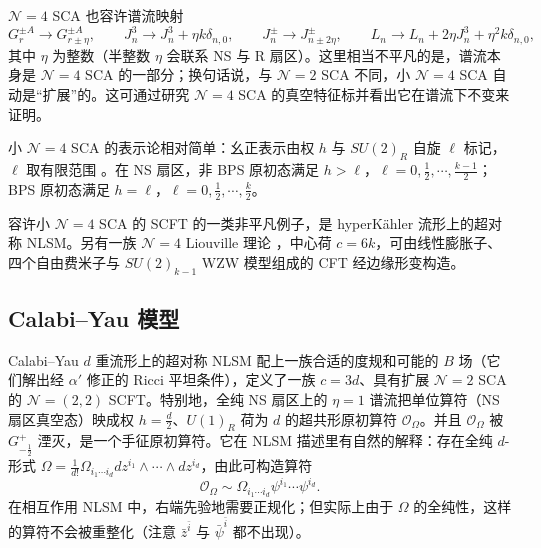 $\mathcal{N}=4$ SCA 也容许谱流映射
\begin{equation}
  \label{eq:4-34}
  G^{\pm A}_r\to G^{\pm A}_{r\pm\eta},\qquad J^3_n\to J^3_n+\eta k\delta_{n,0},\qquad
  J^\pm_n\to J^\pm_{n\pm2\eta},\qquad L_n\to L_n+2\eta J^3_n+\eta^2k\delta_{n,0},
\end{equation}
其中 $\eta$ 为整数（半整数 $\eta$ 会联系 NS 与 R 扇区）。这里相当不平凡的是，谱流本身是 $\mathcal{N}=4$ SCA 的一部分；换句话说，与 $\mathcal{N}=2$ SCA 不同，小 $\mathcal{N}=4$ SCA 自动是“扩展”的。这可通过研究 $\mathcal{N}=4$ SCA 的真空特征标并看出它在谱流下不变来证明。


小 $\mathcal{N}=4$ SCA 的表示论相对简单：幺正表示由权 $h$ 与 $SU(2)_R$ 自旋 $\ell$ 标记，$\ell$ 取有限范围 \cite{r30}。在 NS 扇区，非 BPS 原初态满足 $h>\ell$，$\ell=0,\frac12,\cdots,\frac{k-1}{2}$；BPS 原初态满足 $h=\ell$，$\ell=0,\frac12,\cdots,\frac{k}{2}$。

容许小 $\mathcal{N}=4$ SCA 的 SCFT 的一类非平凡例子，是 hyperKähler 流形上的超对称 NLSM。另有一族 $\mathcal{N}=4$ Liouville 理论 \cite{r31}，中心荷 $c=6k$，可由线性膨胀子、四个自由费米子与 $SU(2)_{k-1}$ WZW 模型组成的 CFT 经边缘形变构造。

\subsection{Calabi--Yau 模型}

Calabi--Yau $d$ 重流形上的超对称 NLSM 配上一族合适的度规和可能的 $B$ 场（它们解出经 $\alpha'$ 修正的 Ricci 平坦条件），定义了一族 $c=3d$、具有扩展 $\mathcal{N}=2$ SCA 的 $\mathcal{N}=(2,2)$ SCFT。特别地，全纯 NS 扇区上的 $\eta=1$ 谱流把单位算符（NS 扇区真空态）映成权 $h=\frac d2$、$U(1)_R$ 荷为 $d$ 的超共形原初算符 $\mathcal{O}_\Omega$。并且 $\mathcal{O}_\Omega$ 被 $G^+_{-\frac12}$ 湮灭，是一个手征原初算符。它在 NLSM 描述里有自然的解释：存在全纯 $d$-形式 $\Omega=\frac{1}{d!}\Omega_{i_1\cdots i_d}dz^{i_1}\wedge\cdots\wedge dz^{i_d}$，由此可构造算符
\begin{equation}
  \label{eq:4-35}
  \mathcal{O}_\Omega\sim\Omega_{i_1\cdots i_d}\psi^{i_1}\cdots\psi^{i_d}.
\end{equation}
在相互作用 NLSM 中，右端先验地需要正规化；但实际上由于 $\Omega$ 的全纯性，这样的算符不会被重整化（注意 $\bar z^{\bar i}$ 与 $\bar\psi^{\bar i}$ 都不出现）。

